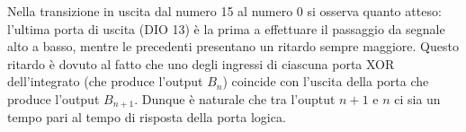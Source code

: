 \documentclass[10pt,a4paper]{article}
\begin{document}
Nella transizione in uscita dal numero 15 al numero 0 si osserva quanto atteso: l'ultima porta di uscita (DIO 13) è la prima a effettuare il passaggio da segnale alto a basso, mentre le precedenti presentano un ritardo sempre maggiore. Questo ritardo è dovuto al fatto che uno degli ingressi di ciascuna porta XOR dell'integrato (che produce l'output $B_n$) coincide con l'uscita della porta che produce l'output $B_{n+1}$. Dunque è naturale che tra l'ouptut $n+1$ e $n$ ci sia un tempo pari al tempo di risposta della porta logica.

\end{document}
